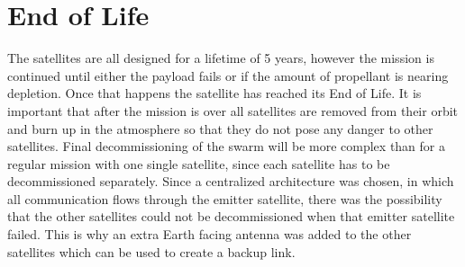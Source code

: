 \section{End of Life}
\label{SSEOL}

The satellites are all designed for a lifetime of 5 years, however the mission is continued until either the payload fails or if the amount of propellant is nearing depletion. Once that happens the satellite has reached its End of Life.
It is important that after the mission is over all satellites are removed from their orbit and burn up in the atmosphere so that they do not pose any danger to other satellites.
Final decommissioning of the swarm will be more complex than for a regular mission with one single satellite, since each satellite has to be decommissioned separately.
Since a centralized architecture was chosen, in which all communication flows through the emitter satellite, there was the possibility that the other satellites could not be decommissioned when that emitter satellite failed. This is why an extra Earth facing antenna was added to the other satellites which can be used to create a backup link.